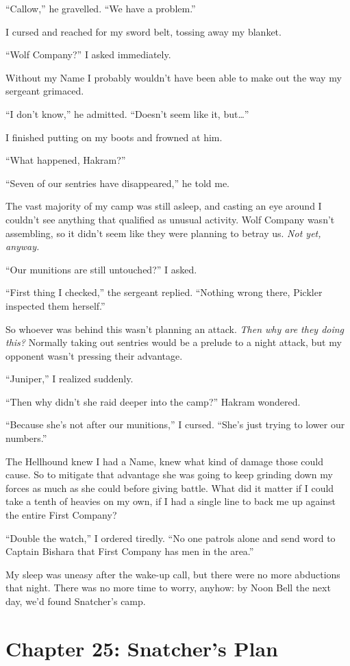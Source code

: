 \documentclass[12pt, openany]{book}
\begin{document}
“Callow,” he gravelled. “We have a problem.”

I cursed and reached for my sword belt, tossing away my blanket.

“Wolf Company?” I asked immediately.

Without my Name I probably wouldn’t have been able to make out the way my sergeant grimaced.

“I don’t know,” he admitted. “Doesn’t seem like it, but…”

I finished putting on my boots and frowned at him.

“What happened, Hakram?”

“Seven of our sentries have disappeared,” he told me.

The vast majority of my camp was still asleep, and casting an eye around I couldn’t see anything that qualified as unusual activity. Wolf Company wasn’t assembling, so it didn’t seem like they were planning to betray us. \textit{Not yet, anyway.}

“Our munitions are still untouched?” I asked.

“First thing I checked,” the sergeant replied. “Nothing wrong there, Pickler inspected them herself.”

So whoever was behind this wasn’t planning an attack. \textit{Then why are they doing this?} Normally taking out sentries would be a prelude to a night attack, but my opponent wasn’t pressing their advantage.

“Juniper,” I realized suddenly.

“Then why didn’t she raid deeper into the camp?” Hakram wondered.

“Because she’s not after our munitions,” I cursed. “She’s just trying to lower our numbers.”

The Hellhound knew I had a Name, knew what kind of damage those could cause. So to mitigate that advantage she was going to keep grinding down my forces as much as she could before giving battle. What did it matter if I could take a tenth of heavies on my own, if I had a single line to back me up against the entire First Company? 

“Double the watch,” I ordered tiredly. “No one patrols alone and send word to Captain Bishara that First Company has men in the area.”

My sleep was uneasy after the wake-up call, but there were no more abductions that night. There was no more time to worry, anyhow: by Noon Bell the next day, we’d found Snatcher’s camp.
\clearpage
\chapter{Chapter 25: Snatcher’s Plan}
\end{document}
